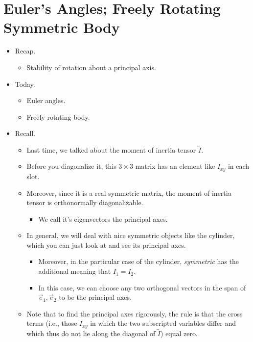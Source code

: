 \documentclass[../notes.tex]{subfiles}
\begin{document}
\section{Euler's Angles; Freely Rotating Symmetric Body}
\begin{itemize}
    \item {}Recap.
    \begin{itemize}
        \item Stability of rotation about a principal axis.
    \end{itemize}
    \item Today.
    \begin{itemize}
        \item Euler angles.
        \item Freely rotating body.
    \end{itemize}
    \item Recall.
    \begin{itemize}
        \item Last time, we talked about the moment of inertia tensor $\overleftrightarrow{I}$.
        \item Before you diagonalize it, this $3\times 3$ matrix has an element like $I_{xy}$ in each slot.
        \item Moreover, since it is a real symmetric matrix, the moment of inertia tensor is orthonormally diagonalizable.
        \begin{itemize}
            \item We call it's eigenvectors the principal axes.
        \end{itemize}
        \item In general, we will deal with nice symmetric objects like the cylinder, which you can just look at and see its principal axes.
        \begin{itemize}
            \item Moreover, in the particular case of the cylinder, \emph{symmetric} has the additional meaning that $I_1=I_2$.
            \item In this case, we can choose any two orthogonal vectors in the span of $\vec{e}_1,\vec{e}_2$ to be the principal axes.
        \end{itemize}
        \item Note that to find the principal axes rigorously, the rule is that the cross terms (i.e., those $I_{xy}$ in which the two subscripted variables differ and which thus do not lie along the diagonal of $\overleftrightarrow{I}$) equal zero.

\end{itemize}
\end{itemize}
\end{document}
